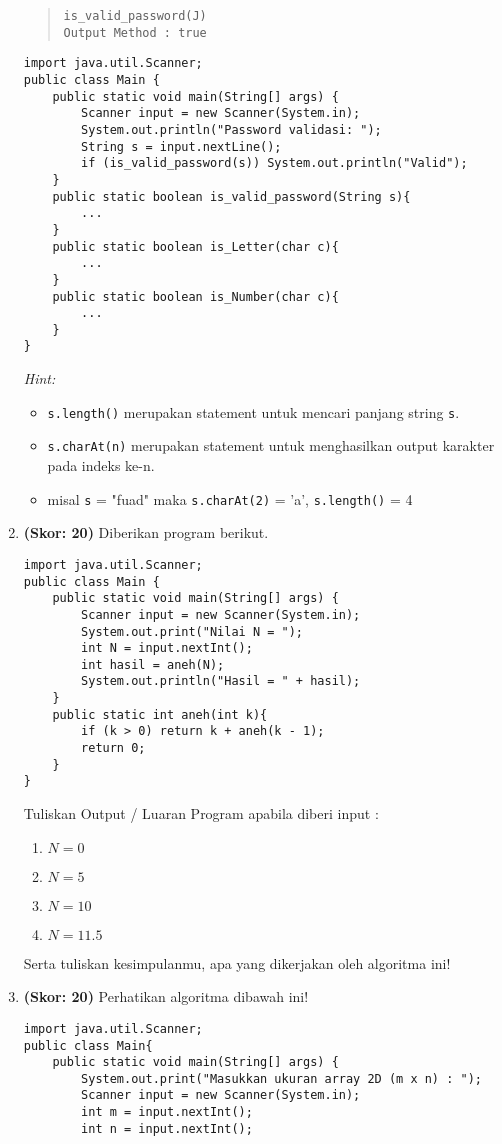 \documentclass[10pt,openany,a4paper]{article}
\begin{document}
\begin{enumerate}
\begin{quote}
\texttt{{\color{blue}is\_valid\_password}(J)\\
Output Method : true}
\end{quote}
\begin{verbatim}
import java.util.Scanner;
public class Main {
    public static void main(String[] args) {
        Scanner input = new Scanner(System.in);
        System.out.println("Password validasi: ");
        String s = input.nextLine();
        if (is_valid_password(s)) System.out.println("Valid");
    }
    public static boolean is_valid_password(String s){
        ...
    }
    public static boolean is_Letter(char c){
        ...
    }
    public static boolean is_Number(char c){
        ...
    }
}
    \end{verbatim}
\textit{Hint:}
\begin{itemize}
    \item \texttt{s.length()} merupakan statement untuk mencari panjang string \texttt{s}.
    \item \texttt{s.charAt(n)} merupakan statement untuk menghasilkan output karakter pada indeks ke-n. 
    \item misal \texttt{s} = "fuad" maka \texttt{s.charAt(2)} = 'a',  \texttt{s.length()} = 4
\end{itemize}
    \item \textbf{(Skor: 20)} Diberikan program berikut.
    \begin{verbatim}
import java.util.Scanner;
public class Main {
    public static void main(String[] args) {
        Scanner input = new Scanner(System.in);
        System.out.print("Nilai N = ");
        int N = input.nextInt();
        int hasil = aneh(N);
        System.out.println("Hasil = " + hasil);
    }
    public static int aneh(int k){
        if (k > 0) return k + aneh(k - 1);
        return 0;
    }
}
    \end{verbatim}
    Tuliskan Output / Luaran Program apabila diberi input :
\begin{enumerate}[label=(\alph*)]
    \item $N = 0$
    \item $N = 5$
    \item $N = 10$
    \item $N = 11.5$
\end{enumerate}
Serta tuliskan kesimpulanmu, apa yang dikerjakan oleh algoritma ini!

    \item \textbf{(Skor: 20)} Perhatikan algoritma dibawah ini!
    \begin{verbatim}
import java.util.Scanner;
public class Main{
	public static void main(String[] args) {
	    System.out.print("Masukkan ukuran array 2D (m x n) : ");
	    Scanner input = new Scanner(System.in);
	    int m = input.nextInt();
	    int n = input.nextInt();
	    

\end{verbatim}
\end{enumerate}
\end{document}
